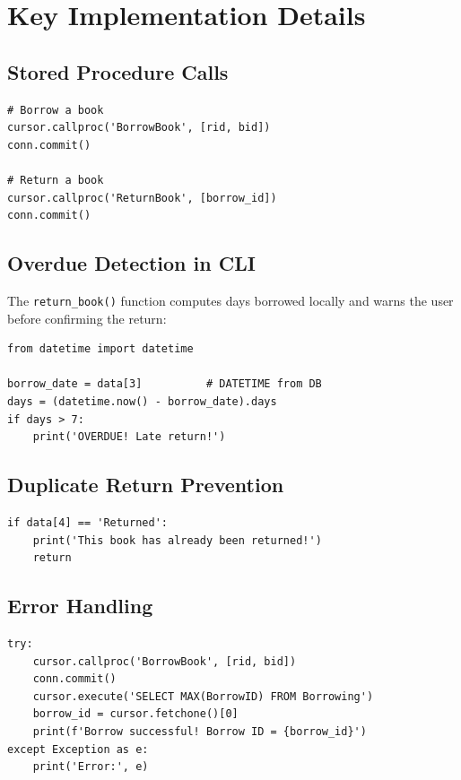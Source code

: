 \documentclass[12pt,a4paper,oneside]{report}
\begin{document}
\section{Key Implementation Details}

\subsection{Stored Procedure Calls}

\begin{lstlisting}[style=pythonstyle]
# Borrow a book
cursor.callproc('BorrowBook', [rid, bid])
conn.commit()

# Return a book
cursor.callproc('ReturnBook', [borrow_id])
conn.commit()
\end{lstlisting}

\subsection{Overdue Detection in CLI}

The \texttt{return\_book()} function computes days borrowed locally and warns
the user before confirming the return:

\begin{lstlisting}[style=pythonstyle]
from datetime import datetime

borrow_date = data[3]          # DATETIME from DB
days = (datetime.now() - borrow_date).days
if days > 7:
    print('OVERDUE! Late return!')
\end{lstlisting}

\subsection{Duplicate Return Prevention}

\begin{lstlisting}[style=pythonstyle]
if data[4] == 'Returned':
    print('This book has already been returned!')
    return
\end{lstlisting}

\subsection{Error Handling}

\begin{lstlisting}[style=pythonstyle]
try:
    cursor.callproc('BorrowBook', [rid, bid])
    conn.commit()
    cursor.execute('SELECT MAX(BorrowID) FROM Borrowing')
    borrow_id = cursor.fetchone()[0]
    print(f'Borrow successful! Borrow ID = {borrow_id}')
except Exception as e:
    print('Error:', e)
\end{lstlisting}
\end{document}
